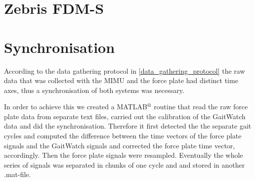 \section{Zebris FDM-S}


\section{Synchronisation}

According to the data gathering protocol in \ref{data_gathering_protocol} the raw data that was collected with the MIMU and the force plate had distinct time axes, thus a synchronisation of both systems was necessary.

In order to achieve this we created a MATLAB$\textsuperscript{\textregistered}$ routine that read the raw force plate data from separate text files, carried out the calibration of the GaitWatch data and did the synchronisation. Therefore it first detected the the separate gait cycles and computed the difference between the time vectors of the force plate signals and the GaitWatch signals and corrected the force plate time vector, accordingly. Then the force plate signals were resampled. Eventually the whole series of signals was separated in chunks of one cycle and and stored in another .mat-file.
